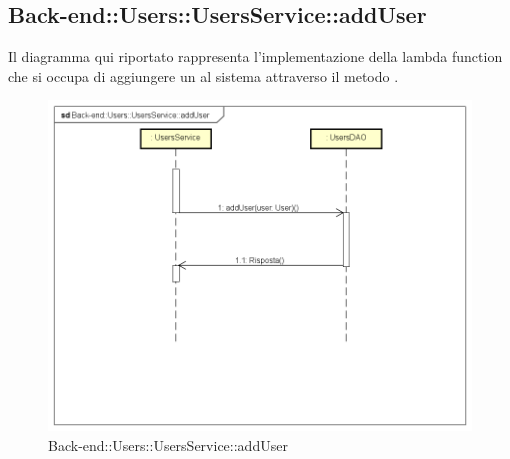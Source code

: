 \subsection{Back-end::Users::UsersService::addUser}
Il diagramma qui riportato rappresenta l'implementazione della lambda function che si occupa di aggiungere un  al sistema attraverso il metodo .
 \begin{figure}[h] \centering \includegraphics[width=\textwidth,height=\textheight,keepaspectratio]{images/diagrams/back-end/Ufficial_Backend/Back-endUsersUsersServiceaddUser.png} 	\caption{Back-end::Users::UsersService::addUser}
\end{figure}

\newpage
